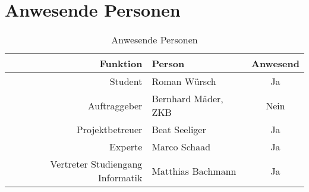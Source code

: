   \section{Anwesende Personen}
    
  \begin{table}[ht]
    \sffamily 
    \begin{center}
      \begin{tabular}{rlc}
        \toprule
        Funktion & Person & Anwesend\\
        \midrule
        Student & Roman Würsch & Ja\\
        Auftraggeber & Bernhard Mäder, ZKB & Nein\\
        Projektbetreuer & Beat Seeliger & Ja\\
        Experte & Marco Schaad & Ja\\
        Vertreter Studiengang Informatik & Matthias Bachmann & Ja\\
        \bottomrule
      \end{tabular}
      \captionsetup{list=no}
      \caption{Anwesende Personen}
      \label{tab:anwesendePersonen}
    \end{center}
  \end{table}


